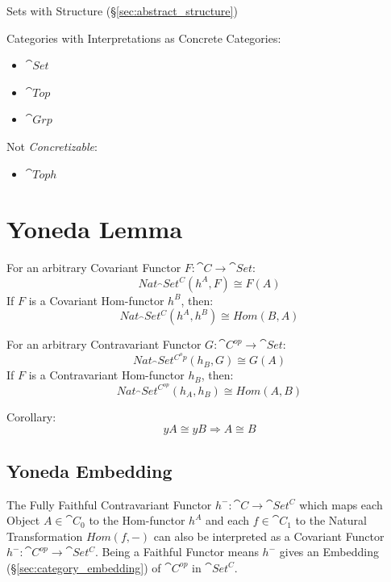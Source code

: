 Sets with Structure (\S\ref{sec:abstract_structure})

Categories with Interpretations as Concrete Categories:
\begin{itemize}
  \item $\cat{Set}$
  \item $\cat{Top}$
  \item $\cat{Grp}$
\end{itemize}

Not \emph{Concretizable}:
\begin{itemize}
  \item $\cat{Toph}$
\end{itemize}



\section{Yoneda Lemma}\label{sec:yoneda_lemma}

For an arbitrary Covariant Functor $F : \cat{C} \rightarrow
\cat{Set}$:
\[
  Nat_\cat{Set^C}(h^A,F) \cong F(A)
\]
If $F$ is a Covariant Hom-functor $h^B$, then:
\[
  Nat_\cat{Set^C}(h^A,h^B) \cong Hom(B,A)
\]

For an arbitrary Contravariant Functor $G : \cat{C}^{op} \rightarrow
\cat{Set}$:
\[
  Nat_\cat{Set^{C^op}}(h_B,G) \cong G(A)
\]
If $F$ is a Contravariant Hom-functor $h_B$, then:
\[
  Nat_\cat{Set^{C^{op}}}(h_A,h_B) \cong Hom(A,B)
\]

Corollary:
\[
  yA \cong yB \Rightarrow A \cong B
\]



\subsection{Yoneda Embedding}\label{sec:yoneda_embedding}

The Fully Faithful Contravariant Functor $h^- : \cat{C} \rightarrow
\cat{Set^C}$ which maps each Object $A \in \cat{C}_0$ to the
Hom-functor $h^A$ and each $f \in \cat{C}_1$ to the Natural
Transformation $Hom(f,-)$ can also be interpreted as a Covariant
Functor $h^- : \cat{C^{op}} \rightarrow \cat{Set^C}$. Being a
Faithful Functor means $h^-$ gives an Embedding
(\S\ref{sec:category_embedding}) of $\cat{C^{op}}$ in
$\cat{Set^C}$.

